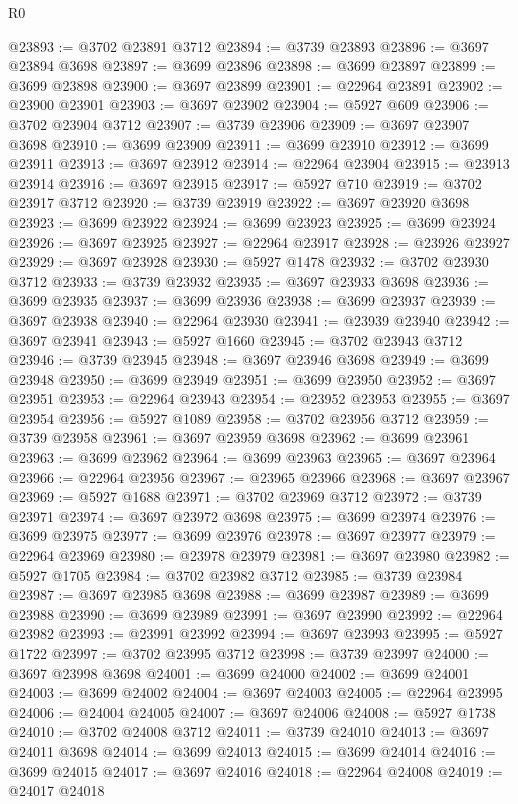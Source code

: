 \begin{lexlean}{R0}
\begin{coremodule}
@23893 := @3702 @23891 @3712
@23894 := @3739 @23893
@23896 := @3697 @23894 @3698
@23897 := @3699 @23896
@23898 := @3699 @23897
@23899 := @3699 @23898
@23900 := @3697 @23899
@23901 := @22964 @23891
@23902 := @23900 @23901
@23903 := @3697 @23902
@23904 := @5927 @609
@23906 := @3702 @23904 @3712
@23907 := @3739 @23906
@23909 := @3697 @23907 @3698
@23910 := @3699 @23909
@23911 := @3699 @23910
@23912 := @3699 @23911
@23913 := @3697 @23912
@23914 := @22964 @23904
@23915 := @23913 @23914
@23916 := @3697 @23915
@23917 := @5927 @710
@23919 := @3702 @23917 @3712
@23920 := @3739 @23919
@23922 := @3697 @23920 @3698
@23923 := @3699 @23922
@23924 := @3699 @23923
@23925 := @3699 @23924
@23926 := @3697 @23925
@23927 := @22964 @23917
@23928 := @23926 @23927
@23929 := @3697 @23928
@23930 := @5927 @1478
@23932 := @3702 @23930 @3712
@23933 := @3739 @23932
@23935 := @3697 @23933 @3698
@23936 := @3699 @23935
@23937 := @3699 @23936
@23938 := @3699 @23937
@23939 := @3697 @23938
@23940 := @22964 @23930
@23941 := @23939 @23940
@23942 := @3697 @23941
@23943 := @5927 @1660
@23945 := @3702 @23943 @3712
@23946 := @3739 @23945
@23948 := @3697 @23946 @3698
@23949 := @3699 @23948
@23950 := @3699 @23949
@23951 := @3699 @23950
@23952 := @3697 @23951
@23953 := @22964 @23943
@23954 := @23952 @23953
@23955 := @3697 @23954
@23956 := @5927 @1089
@23958 := @3702 @23956 @3712
@23959 := @3739 @23958
@23961 := @3697 @23959 @3698
@23962 := @3699 @23961
@23963 := @3699 @23962
@23964 := @3699 @23963
@23965 := @3697 @23964
@23966 := @22964 @23956
@23967 := @23965 @23966
@23968 := @3697 @23967
@23969 := @5927 @1688
@23971 := @3702 @23969 @3712
@23972 := @3739 @23971
@23974 := @3697 @23972 @3698
@23975 := @3699 @23974
@23976 := @3699 @23975
@23977 := @3699 @23976
@23978 := @3697 @23977
@23979 := @22964 @23969
@23980 := @23978 @23979
@23981 := @3697 @23980
@23982 := @5927 @1705
@23984 := @3702 @23982 @3712
@23985 := @3739 @23984
@23987 := @3697 @23985 @3698
@23988 := @3699 @23987
@23989 := @3699 @23988
@23990 := @3699 @23989
@23991 := @3697 @23990
@23992 := @22964 @23982
@23993 := @23991 @23992
@23994 := @3697 @23993
@23995 := @5927 @1722
@23997 := @3702 @23995 @3712
@23998 := @3739 @23997
@24000 := @3697 @23998 @3698
@24001 := @3699 @24000
@24002 := @3699 @24001
@24003 := @3699 @24002
@24004 := @3697 @24003
@24005 := @22964 @23995
@24006 := @24004 @24005
@24007 := @3697 @24006
@24008 := @5927 @1738
@24010 := @3702 @24008 @3712
@24011 := @3739 @24010
@24013 := @3697 @24011 @3698
@24014 := @3699 @24013
@24015 := @3699 @24014
@24016 := @3699 @24015
@24017 := @3697 @24016
@24018 := @22964 @24008
@24019 := @24017 @24018

\end{coremodule}
\end{lexlean}
